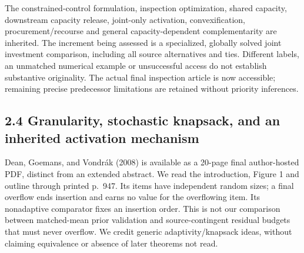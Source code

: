 \documentclass[
  11pt,
  a4paper,
]{article}
\begin{document}
The constrained-control formulation, inspection optimization, shared
capacity, downstream capacity release, joint-only activation,
convexification, procurement/recourse and general capacity-dependent
complementarity are inherited. The increment being assessed is a
specialized, globally solved joint investment comparison, including all
source alternatives and ties. Different labels, an unmatched numerical
example or unsuccessful access do not establish substantive originality.
The actual final inspection article is now accessible; remaining precise
predecessor limitations are retained without priority inferences.

\hypertarget{granularity-stochastic-knapsack-and-an-inherited-activation-mechanism}{%
\subsection{2.4 Granularity, stochastic knapsack, and an inherited
activation
mechanism}\label{granularity-stochastic-knapsack-and-an-inherited-activation-mechanism}}

Dean, Goemans, and Vondrák (2008) is available as a 20-page final
author-hosted PDF, distinct from an extended abstract. We read the
introduction, Figure 1 and outline through printed p.~947. Its items
have independent random sizes; a final overflow ends insertion and earns
no value for the overflowing item. Its nonadaptive comparator fixes an
insertion order. This is not our comparison between matched-mean prior
validation and source-contingent residual budgets that must never
overflow. We credit generic adaptivity/knapsack ideas, without claiming
equivalence or absence of later theorems not read.
\end{document}
